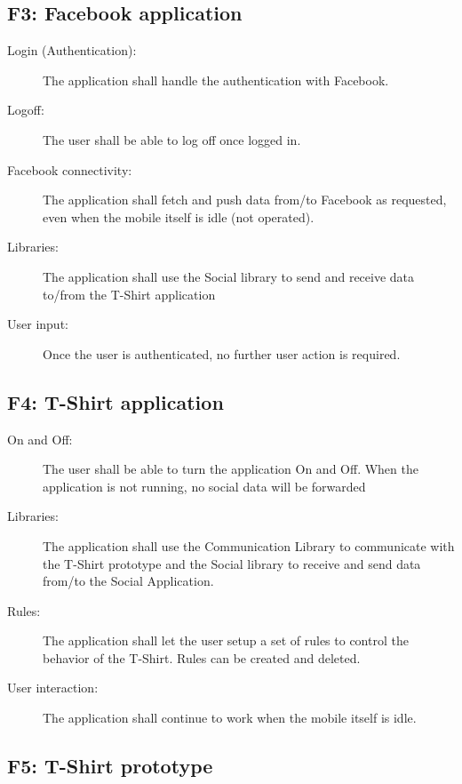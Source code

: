 	\newpage

	\subsection{F3: Facebook application}

	\begin{description}
		\item[Login (Authentication):] The application shall handle the authentication with Facebook.
		\item[Logoff:] The user shall be able to log off once logged in.
		\item[Facebook connectivity:] The application shall fetch and push data
		from/to Facebook as requested, even when the mobile itself is idle (not operated).
		\item[Libraries:] The application shall use the Social library to send and receive
		data to/from the T-Shirt application
		\item[User input:] Once the user is authenticated, no further user action is required.
	\end{description}

	\subsection{F4: T-Shirt application}
	
	\begin{description}
		\item[On and Off:] The user shall be able to turn the application On and Off.
		When the application is not running, no social data will be forwarded
		\item[Libraries:] The application shall use the Communication Library to
		communicate with the T-Shirt prototype and the Social library to
		receive and send data from/to the Social Application.
		\item[Rules:] The application shall let the user setup a set of rules
		to control the behavior of the T-Shirt. Rules can be created and deleted.
		\item[User interaction:] The application shall continue to work
		when the mobile itself is idle.
	\end{description}

	

	\subsection{F5: T-Shirt prototype}

